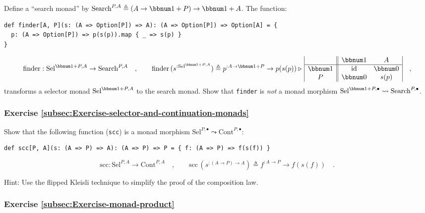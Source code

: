 Define a \textsf{``}search
monad\textsf{''} by $\text{Search}^{P,A}\triangleq\left(A\rightarrow\bbnum 1+P\right)\rightarrow\bbnum 1+A$.
The function:
\begin{lstlisting}
def finder[A, P](s: (A => Option[P]) => A): (A => Option[P]) => Option[A] = {
  p: (A => Option[P]) => p(s(p)).map { _ => s(p) }
}
\end{lstlisting}
\[
\text{finder}:\text{Sel}^{\bbnum 1+P,A}\rightarrow\text{Search}^{P,A}\quad,\quad\quad\text{finder}\,(s^{:\text{Sel}^{\bbnum 1+P,A}})\triangleq p^{:A\rightarrow\bbnum 1+P}\rightarrow p(s(p))\triangleright\,\begin{array}{|c||cc|}
 & \bbnum 1 & A\\
\hline \bbnum 1 & \text{id} & \bbnum 0\\
P & \bbnum 0 & s(p)
\end{array}\quad,
\]
transforms a selector
monad $\text{Sel}^{\bbnum 1+P,A}$ to the search monad. Show that
\lstinline!finder! is \emph{not} a monad morphism $\text{Sel}^{\bbnum 1+P,\bullet}\leadsto\text{Search}^{P,\bullet}$.

\subsubsection{Exercise \label{subsec:Exercise-selector-and-continuation-monads}\ref{subsec:Exercise-selector-and-continuation-monads}}

Show that the following function (\lstinline!scc!) is a monad morphism
$\text{Sel}^{P,\bullet}\leadsto\text{Cont}^{P,\bullet}$:
\begin{lstlisting}
def scc[P, A](s: (A => P) => A): (A => P) => P = { f: (A => P) => f(s(f)) }
\end{lstlisting}
\[
\text{scc}:\text{Sel}^{P,A}\rightarrow\text{Cont}^{P,A}\quad,\quad\quad\text{scc}\,(s^{:(A\rightarrow P)\rightarrow A})\triangleq f^{:A\rightarrow P}\rightarrow f(s(f))\quad.
\]

Hint: Use the flipped Kleisli technique to simplify the proof of the
composition law.

\subsubsection{Exercise \label{subsec:Exercise-monad-product}\ref{subsec:Exercise-monad-product}}

